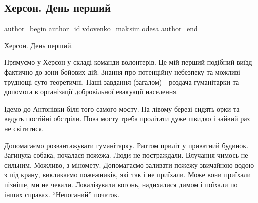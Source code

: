  
 
 
 
 

\subsection{Херсон. День перший}
\label{sec:27_12_2022.fb.vdovenko_maksim.odesa.1.kherson__den_pershii}

\ifcmt
 author_begin
   author_id vdovenko_maksim.odesa
 author_end
\fi

Херсон. День перший.

Прямуємо у Херсон у складі команди волонтерів. Це мій перший подібний виїзд
фактично до зони бойових дій. Знання про потенційну небезпеку та можливі
труднощі суто теоретичні. Наші завдання (загалом) - роздача гуманітарки та
допомога в організації добровільної евакуації населення.

Їдемо до Антонівки біля того самого мосту. На лівому березі сидять орки та
ведуть постійні обстріли. Повз мосту треба пролітати дуже швидко і зайвий раз
не світитися.

Допомагаємо розвантажувати гуманітарку. Раптом приліт у приватний будинок.
Загинула собака, почалася пожежа. Люди не постраждали. Влучання чимось не
сильним. Можливо, з міномету. Допомагаємо заливати пожежу звичайною водою з під
крану, викликаємо пожежників, які так і не приїхали. Може вони приїхали
пізніше, ми не чекали. Локалізували вогонь, надихалися димом і поїхали по інших
справах. \enquote{Непоганий} початок.
